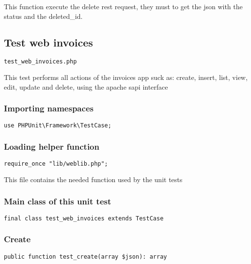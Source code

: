\documentclass[a4paper]{article}
\begin{document}
This function execute the delete rest request, they must to get the json
with the status and the deleted\_id.

\hypertarget{toc66}{}
\subsection{Test web invoices}

\begin{lstlisting}
test_web_invoices.php
\end{lstlisting}

This test performs all actions of the invoices app suck as: create, insert,
list, view, edit, update and delete, using the apache sapi interface

\hypertarget{toc67}{}
\subsubsection{Importing namespaces}

\begin{lstlisting}
use PHPUnit\Framework\TestCase;
\end{lstlisting}

\hypertarget{toc68}{}
\subsubsection{Loading helper function}

\begin{lstlisting}
require_once "lib/weblib.php";
\end{lstlisting}

This file contains the needed function used by the unit tests

\hypertarget{toc69}{}
\subsubsection{Main class of this unit test}

\begin{lstlisting}
final class test_web_invoices extends TestCase
\end{lstlisting}

\hypertarget{toc70}{}
\subsubsection{Create}

\begin{lstlisting}
public function test_create(array $json): array
\end{lstlisting}
\end{document}
